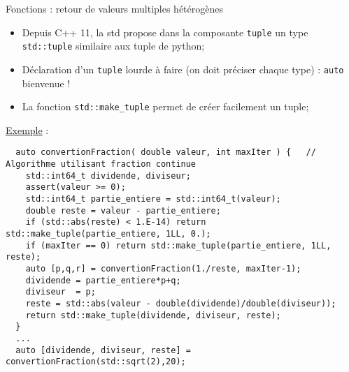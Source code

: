 \documentclass[compress,10pt,aspectratio=169]{beamer}
\begin{document}
  \begin{frame}[fragile]{Fonctions : retour de valeurs multiples hétérogènes}
    \scriptsize
  
  \begin{itemize}
  \item Depuis C++ 11, la std propose dans la composante \texttt{tuple} un type \texttt{std::tuple} similaire aux tuple de python;
  \item Déclaration d'un \texttt{tuple} lourde à faire (on doit préciser chaque type) : \texttt{auto} bienvenue !
  \item La fonction \texttt{std::make\_tuple} permet de créer facilement un tuple;
  \end{itemize}
  
  \underline{\textcolor{NavyBlue}{Exemple}} :
  \begin{verbatim}
  auto convertionFraction( double valeur, int maxIter ) {   // Algorithme utilisant fraction continue
    std::int64_t dividende, diviseur;
    assert(valeur >= 0);
    std::int64_t partie_entiere = std::int64_t(valeur);
    double reste = valeur - partie_entiere;
    if (std::abs(reste) < 1.E-14) return std::make_tuple(partie_entiere, 1LL, 0.);
    if (maxIter == 0) return std::make_tuple(partie_entiere, 1LL, reste);
    auto [p,q,r] = convertionFraction(1./reste, maxIter-1);
    dividende = partie_entiere*p+q;
    diviseur  = p;
    reste = std::abs(valeur - double(dividende)/double(diviseur));
    return std::make_tuple(dividende, diviseur, reste);
  }
  ... 
  auto [dividende, diviseur, reste] = convertionFraction(std::sqrt(2),20);
  \end{verbatim}
  \end{frame}
  
\end{document}
